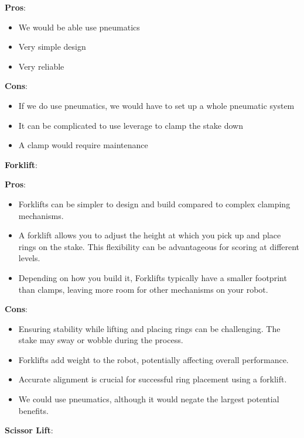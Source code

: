 \noindent
\textbf{Pros}:
\begin{itemize}
    \item We would be able use pneumatics 
    \item Very simple design
    \item Very reliable
\end{itemize}
\textbf{Cons}:
\begin{itemize}
    \item If we do use pneumatics, we would have to set up a whole pneumatic system 
    \item It can be complicated to use leverage to clamp the stake down
    \item A clamp would require maintenance 
\end{itemize}

\noindent
\textbf{Forklift}:

\noindent
\textbf{Pros}:
\begin{itemize}
    \item Forklifts can be simpler to design and build compared to complex clamping mechanisms.
    \item A forklift allows you to adjust the height at which you pick up and place rings on the stake. This flexibility can be advantageous for scoring at different levels.
    \item Depending on how you build it, Forklifts typically have a smaller footprint than clamps, leaving more room for other mechanisms on your robot.
\end{itemize}
\textbf{Cons}:
\begin{itemize}
    \item  Ensuring stability while lifting and placing rings can be challenging. The stake may sway or wobble during the process.
    \item Forklifts add weight to the robot, potentially affecting overall performance.
    \item Accurate alignment is crucial for successful ring placement using a forklift.
    \item We could use pneumatics, although it would negate the largest potential benefits.
\end{itemize}
\noindent
\textbf{Scissor Lift}:

